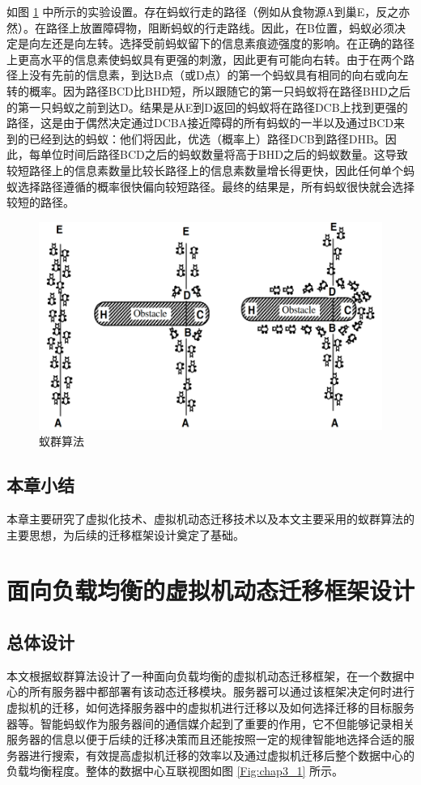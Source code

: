 如图 \ref{Fig:chap2_6} 中所示的实验设置。存在蚂蚁行走的路径（例如从食物源A到巢E，反之亦然）。在路径上放置障碍物，阻断蚂蚁的行走路线。因此，在B位置，蚂蚁必须决定是向左还是向左转。选择受前蚂蚁留下的信息素痕迹强度的影响。在正确的路径上更高水平的信息素使蚂蚁具有更强的刺激，因此更有可能向右转。由于在两个路径上没有先前的信息素，到达B点（或D点）的第一个蚂蚁具有相同的向右或向左转的概率。因为路径BCD比BHD短，所以跟随它的第一只蚂蚁将在路径BHD之后的第一只蚂蚁之前到达D。结果是从E到D返回的蚂蚁将在路径DCB上找到更强的路径，这是由于偶然决定通过DCBA接近障碍的所有蚂蚁的一半以及通过BCD来到的已经到达的蚂蚁：他们将因此，优选（概率上）路径DCB到路径DHB。因此，每单位时间后路径BCD之后的蚂蚁数量将高于BHD之后的蚂蚁数量。这导致较短路径上的信息素数量比较长路径上的信息素数量增长得更快，因此任何单个蚂蚁选择路径遵循的概率很快偏向较短路径。最终的结果是，所有蚂蚁很快就会选择较短的路径。

\begin{figure}[ht]
  \centering
  \includegraphics{./Figure/IMG_Chap2_6.png}
  \caption{蚁群算法}\label{Fig:chap2_6}
\end{figure}

\section{本章小结}
本章主要研究了虚拟化技术、虚拟机动态迁移技术以及本文主要采用的蚁群算法的主要思想，为后续的迁移框架设计奠定了基础。

\chapter{面向负载均衡的虚拟机动态迁移框架设计}

\section{总体设计}
本文根据蚁群算法设计了一种面向负载均衡的虚拟机动态迁移框架，在一个数据中心的所有服务器中都部署有该动态迁移模块。服务器可以通过该框架决定何时进行虚拟机的迁移，如何选择服务器中的虚拟机进行迁移以及如何选择迁移的目标服务器等。智能蚂蚁作为服务器间的通信媒介起到了重要的作用，它不但能够记录相关服务器的信息以便于后续的迁移决策而且还能按照一定的规律智能地选择合适的服务器进行搜索，有效提高虚拟机迁移的效率以及通过虚拟机迁移后整个数据中心的负载均衡程度。整体的数据中心互联视图如图 \ref{Fig:chap3_1} 所示。

